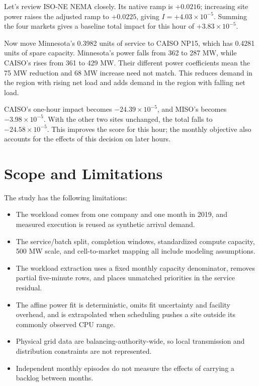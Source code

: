 \documentclass[conference]{IEEEtran}
\begin{document}
Let's review ISO-NE NEMA closely. Its native ramp is \(+0.0216\); increasing
site power raises the adjusted ramp to \(+0.0225\), giving
\(I=+4.03\times10^{-5}\). Summing the four markets gives a baseline
total impact for this hour of \(+3.83\times10^{-5}\).

Now move Minnesota's 0.3982 units of service to CAISO NP15, which has
0.4281 units of spare capacity. Minnesota's power falls from 362 to
287 MW, while CAISO's rises from 361 to 429 MW. Their different power
coefficients mean the 75 MW reduction and 68 MW increase need not match.
This reduces demand in the region with rising net load and adds demand
in the region with falling net load.

CAISO's one-hour impact becomes \(-24.39\times10^{-5}\), and MISO's becomes
\(-3.98\times10^{-5}\). With the other two sites unchanged, the total
falls to \(-24.58\times10^{-5}\). This improves the score for this
hour; the monthly objective also accounts for the effects of this decision
on later hours.

\section{Scope and Limitations}
\label{sec:limitations}

The study has the following limitations:
\begin{itemize}
  \item The workload comes from one company and one month in 2019, and
        measured execution is reused as synthetic arrival demand.
  \item The service/batch split, completion windows, standardized compute
        capacity, 500 MW scale, and cell-to-market mapping all include
        modeling assumptions.
  \item The workload extraction uses a fixed monthly capacity denominator,
        removes partial five-minute rows, and places unmatched priorities in
        the service residual.
  \item The affine power fit is deterministic, omits fit uncertainty and
        facility overhead, and is extrapolated when scheduling pushes a site
        outside its commonly observed CPU range.
  \item Physical grid data are balancing-authority-wide, so local
        transmission and distribution constraints are not represented.
  \item Independent monthly episodes do not measure the effects of
        carrying a backlog between months.
\end{itemize}
\end{document}
